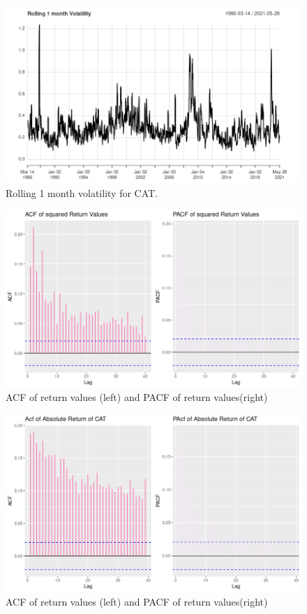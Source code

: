 \documentclass{article}
\begin{document}
\begin{figure}[h]
	\centering
	\includegraphics[width=\linewidth]{monthly_volatility}
	\caption{Rolling 1 month volatility for CAT.}
	\label{fig:volatility}
\end{figure}
\begin{figure}[h]
	\centering
	\includegraphics[width=\linewidth]{acf_pacf_squared}
	\caption{ACF of return values (left) and PACF of return values(right)}
	\label{fig:acfErr}
\end{figure}

\begin{figure}[h]
	\centering
	\includegraphics[width=\linewidth]{acf_pacf_of_cat}
	\caption{ACF of return values (left) and PACF of return values(right)}
	\label{fig:acf}
\end{figure}
\end{document}
